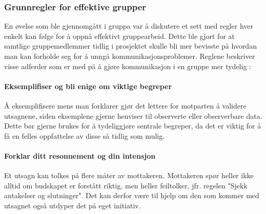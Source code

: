\subsubsection{Grunnregler for effektive grupper}

En øvelse som ble gjennomgått i gruppa var å diskutere et sett med regler hver enkelt kan følge for å oppnå effektivt gruppearbeid.
Dette ble gjort for at samtlige gruppemedlemmer tidlig i prosjektet skulle bli mer bevisste på hvordan man kan forholde seg for å unngå kommunikasjonsproblemer.
Reglene beskriver visse adferder som er med på å gjøre kommunikasjon i en gruppe mer tydelig \cite{schwarz}:




\paragraph{Eksemplifiser og bli enige om viktige begreper}
Å eksemplifisere mens man forklarer gjør det lettere for motparten å validere utsagnene, siden eksemplene gjerne henviser til observerte eller observerbare data.
Dette bør gjerne brukes for å tydeliggjøre sentrale begreper, da det er viktig for å få en felles oppfattelse av disse så tidlig som mulig.

\paragraph{Forklar ditt resonnement og din intensjon}\label{forklardittres}
Et utsagn kan tolkes på flere måter av mottakeren.
Mottakeren spør heller ikke alltid om budskapet er forstått riktig, men heller feiltolker, jfr. regelen "Sjekk antakelser og slutninger".
Det kan derfor være til hjelp om den som kommer med utsagnet også utdyper det på eget initiativ.



